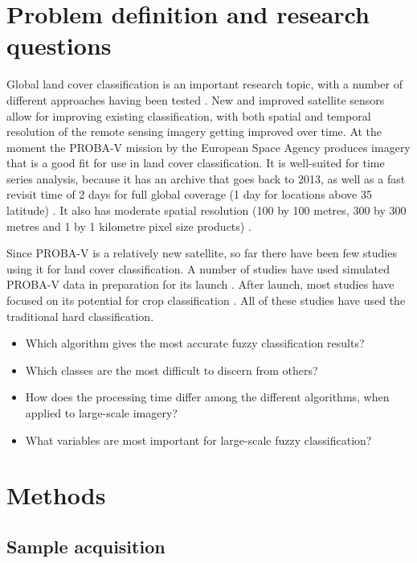 \documentclass[a4paper,10pt]{article}
\begin{document}
\section{Problem definition and research questions}

Global land cover classification is an important research topic, with a number of different approaches having been tested \cite{hansen2000hardtree}. New and improved satellite sensors allow for improving existing classification, with both spatial and temporal resolution of the remote sensing imagery getting improved over time. At the moment the PROBA-V mission by the European Space Agency produces imagery that is a good fit for use in land cover classification. It is well-suited for time series analysis, because it has an archive that goes back to 2013, as well as a fast revisit time of 2 days for full global coverage (1 day for locations above 35\textdegree{} latitude) \cite{dierckx2014probav}. It also has moderate spatial resolution (100 by 100 metres, 300 by 300 metres and 1 by 1 kilometre pixel size products) \cite{probavguide}.

Since PROBA-V is a relatively new satellite, so far there have been few studies using it for land cover classification. A number of studies have used simulated PROBA-V data in preparation for its launch \cite{stathakis2014probavurban} \cite{roumenina2013probavcrops}. After launch, most studies have focused on its potential for crop classification \cite{roumenina2015probavcrops} \cite{durgun2016crop} \cite{lambert2016cropland}. All of these studies have used the traditional hard classification.



\begin{itemize}
 \item Which algorithm gives the most accurate fuzzy classification results?
 \item Which classes are the most difficult to discern from others?
 \item How does the processing time differ among the different algorithms, when applied to large-scale imagery?
 \item What variables are most important for large-scale fuzzy classification?
\end{itemize}

\section{Methods}

\subsection{Sample acquisition}
\end{document}
